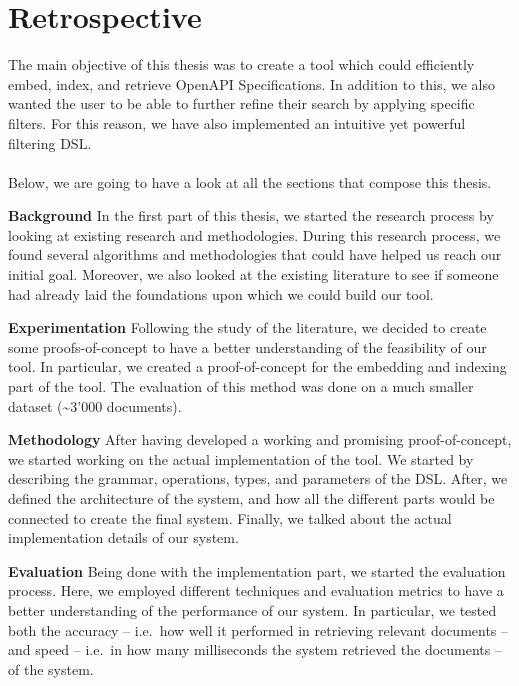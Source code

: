 \section{Retrospective}\label{sec:retrospective}
The main objective of this thesis was to create a tool which could efficiently embed, index, and retrieve OpenAPI Specifications.
In addition to this, we also wanted the user to be able to further refine their search by applying specific filters.
For this reason, we have also implemented an intuitive yet powerful filtering DSL\@. \\ \\
Below, we are going to have a look at all the sections that compose this thesis.

\begin{description}
    \item \textbf{Background} In the first part of this thesis, we started the research process by looking at existing research and methodologies.
    During this research process, we found several algorithms and methodologies that could have helped us reach our initial goal.
    Moreover, we also looked at the existing literature to see if someone had already laid the foundations upon which we could build our tool.
    \item \textbf{Experimentation} Following the study of the literature, we decided to create some proofs-of-concept to have a better understanding of the feasibility of our tool.
    In particular, we created a proof-of-concept for the embedding and indexing part of the tool.
    The evaluation of this method was done on a much smaller dataset (\textasciitilde 3'000 documents).
    \item \textbf{Methodology} After having developed a working and promising proof-of-concept, we started working on the actual implementation of the tool.
    We started by describing the grammar, operations, types, and parameters of the DSL\@.
    After, we defined the architecture of the system, and how all the different parts would be connected to create the final system.
    Finally, we talked about the actual implementation details of our system.
    \item \textbf{Evaluation} Being done with the implementation part, we started the evaluation process.
    Here, we employed different techniques and evaluation metrics to have a better understanding of the performance of our system.
    In particular, we tested both the accuracy -- i.e.\ how well it performed in retrieving relevant documents -- and speed -- i.e.\ in how many milliseconds the system retrieved the documents -- of the system.
\end{description}
